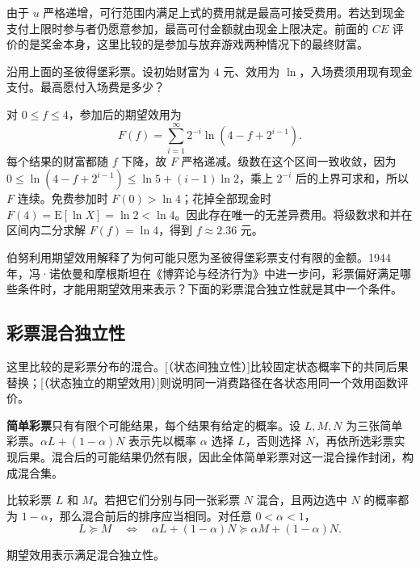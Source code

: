 由于 $u$ 严格递增，可行范围内满足上式的费用就是最高可接受费用。若达到现金支付上限时参与者仍愿意参加，最高可付金额就由现金上限决定。前面的 $CE$ 评价的是奖金本身，这里比较的是参加与放弃游戏两种情况下的最终财富。

\begin{tcolorbox}[example,title=补充算例：初始财富为 4 元时的入场费]
\begin{question}
沿用上面的圣彼得堡彩票。设初始财富为 $4$ 元、效用为 $\ln$，入场费须用现有现金支付。最高愿付入场费是多少？
\end{question}
\begin{solution}[blank-type=manual,blank-vsep=5\baselineskip]
对 $0\le f\le4$，参加后的期望效用为
\[
 F(f)=\sum_{i=1}^\infty 2^{-i}\ln(4-f+2^{i-1}).
\]
每个结果的财富都随 $f$ 下降，故 $F$ 严格递减。级数在这个区间一致收敛，因为 $0\le\ln(4-f+2^{i-1})\le\ln 5+(i-1)\ln 2$，乘上 $2^{-i}$ 后的上界可求和，所以 $F$ 连续。免费参加时 $F(0)>\ln4$；花掉全部现金时 $F(4)=\mathrm E[\ln X]=\ln2<\ln4$。因此存在唯一的无差异费用。将级数求和并在区间内二分求解 $F(f)=\ln4$，得到 $f\approx2.36$ 元。
\end{solution}
\end{tcolorbox}

伯努利用期望效用解释了为何可能只愿为圣彼得堡彩票支付有限的金额。1944 年，冯·诺依曼和摩根斯坦在《博弈论与经济行为》中进一步问，彩票偏好满足哪些条件时，才能用期望效用来表示？下面的彩票混合独立性就是其中一个条件。

\subsection{彩票混合独立性}\label{sec:wj-six-lottery}
这里比较的是彩票分布的混合。[（状态间独立性）]比较固定状态概率下的共同后果替换；[（状态独立的期望效用）]则说明同一消费路径在各状态用同一个效用函数评价。

\textbf{简单彩票}只有有限个可能结果，每个结果有给定的概率。设 $L,M,N$ 为三张简单彩票。$\alpha L+(1-\alpha)N$ 表示先以概率 $\alpha$ 选择 $L$，否则选择 $N$，再依所选彩票实现后果。混合后的可能结果仍然有限，因此全体简单彩票对这一混合操作封闭，构成混合集。
\begin{tcolorbox}[knowledge,title=彩票混合独立性]
比较彩票 $L$ 和 $M$。若把它们分别与同一张彩票 $N$ 混合，且两边选中 $N$ 的概率都为 $1-\alpha$，那么混合前后的排序应当相同。对任意 $0<\alpha<1$，
\begin{equation*}
 L\succeq M\quad\Longleftrightarrow\quad
 \alpha L+(1-\alpha)N\succeq\alpha M+(1-\alpha)N.
 \tag{6.III}\label{eq:wj-six-mixture}
\end{equation*}
\end{tcolorbox}
期望效用表示满足混合独立性。

